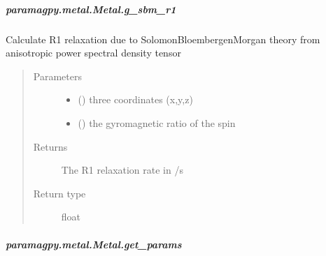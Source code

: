 \documentclass[a4paper,10pt,english,openany,oneside]{sphinxmanual}
\begin{document}
\begin{fulllineitems}
\begin{fulllineitems}
\begin{fulllineitems}
\end{fulllineitems}



\subparagraph{paramagpy.metal.Metal.g\_sbm\_r1}
\label{\detokenize{reference/generated/paramagpy.metal.Metal.g_sbm_r1:paramagpy-metal-metal-g-sbm-r1}}\label{\detokenize{reference/generated/paramagpy.metal.Metal.g_sbm_r1::doc}}

\begin{fulllineitems}
\label{\detokenize{reference/generated/paramagpy.metal.Metal.g_sbm_r1:paramagpy.metal.Metal.g_sbm_r1}}
\sphinxAtStartPar
Calculate R1 relaxation due to Solomon\sphinxhyphen{}Bloembergen\sphinxhyphen{}Morgan theory
from anisotropic power spectral density tensor
\begin{quote}\begin{description}
\item[{Parameters}] \leavevmode\begin{itemize}
\item {} 
\sphinxAtStartPar
{} () \textendash{} three coordinates (x,y,z)

\item {} 
\sphinxAtStartPar
{} () \textendash{} the gyromagnetic ratio of the spin

\end{itemize}

\item[{Returns}] \leavevmode
\sphinxAtStartPar
{} \textendash{} The R1 relaxation rate in /s

\item[{Return type}] \leavevmode
\sphinxAtStartPar
float

\end{description}\end{quote}

\end{fulllineitems}



\subparagraph{paramagpy.metal.Metal.get\_params}
\label{\detokenize{reference/generated/paramagpy.metal.Metal.get_params:paramagpy-metal-metal-get-params}}\label{\detokenize{reference/generated/paramagpy.metal.Metal.get_params::doc}}


\end{fulllineitems}
\end{fulllineitems}
\end{document}
